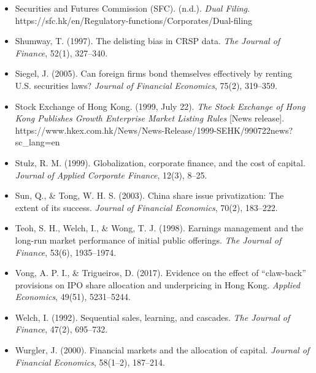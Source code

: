 \documentclass[11pt,letterpaper]{article}
\begin{document}
\begin{itemize}
\item Securities and Futures Commission (SFC). (n.d.). \textit{Dual Filing}. https://sfc.hk/en/Regulatory-functions/Corporates/Dual-filing
\item Shumway, T. (1997). The delisting bias in CRSP data. \textit{The Journal of Finance}, 52(1), 327–340.
\item Siegel, J. (2005). Can foreign firms bond themselves effectively by renting U.S. securities laws? \textit{Journal of Financial Economics}, 75(2), 319–359.
\item Stock Exchange of Hong Kong. (1999, July 22). \textit{The Stock Exchange of Hong Kong Publishes Growth Enterprise Market Listing Rules} [News release]. https://www.hkex.com.hk/News/News-Release/1999-SEHK/990722news?sc\_lang=en
\item Stulz, R. M. (1999). Globalization, corporate finance, and the cost of capital. \textit{Journal of Applied Corporate Finance}, 12(3), 8–25.
\item Sun, Q., \& Tong, W. H. S. (2003). China share issue privatization: The extent of its success. \textit{Journal of Financial Economics}, 70(2), 183–222.
\item Teoh, S. H., Welch, I., \& Wong, T. J. (1998). Earnings management and the long-run market performance of initial public offerings. \textit{The Journal of Finance}, 53(6), 1935–1974.
\item Vong, A. P. I., \& Trigueiros, D. (2017). Evidence on the effect of ``claw-back'' provisions on IPO share allocation and underpricing in Hong Kong. \textit{Applied Economics}, 49(51), 5231–5244.
\item Welch, I. (1992). Sequential sales, learning, and cascades. \textit{The Journal of Finance}, 47(2), 695–732.
\item Wurgler, J. (2000). Financial markets and the allocation of capital. \textit{Journal of Financial Economics}, 58(1–2), 187–214.
\end{itemize}
\end{document}
